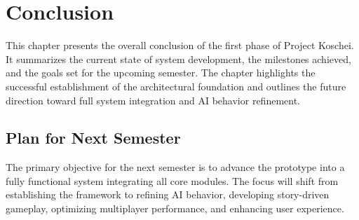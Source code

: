 \chapter{Conclusion}

This chapter presents the overall conclusion of the first phase of Project Koschei. It summarizes the current state of system development, the milestones achieved, and the goals set for the upcoming semester. The chapter highlights the successful establishment of the architectural foundation and outlines the future direction toward full system integration and AI behavior refinement.

\section{Plan for Next Semester}

The primary objective for the next semester is to advance the prototype into a fully functional system integrating all core modules. The focus will shift from establishing the framework to refining AI behavior, developing story-driven gameplay, optimizing multiplayer performance, and enhancing user experience.

